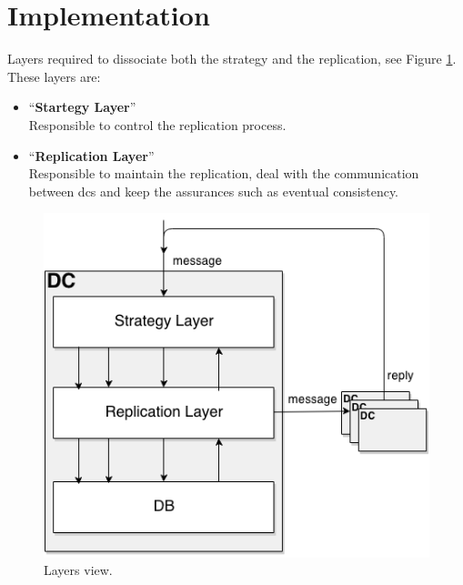 \documentclass[english]{article}
\begin{document}
\section{Implementation}
Layers required to dissociate both the strategy  and the replication, see Figure \ref{fig:layers_view}. These layers are:
\begin{itemize}
	\item \textquotedblleft{\bf Startegy Layer}\textquotedblright\\
	Responsible to control the replication process.
	
	\item \textquotedblleft{\bf Replication Layer}\textquotedblright\\
	Responsible to maintain the replication, deal with the communication between \glspl{dc} and keep the assurances such as eventual consistency.
\end{itemize}
\begin{figure}[ht!]
	\centering
	\includegraphics[width=1\textwidth]{adatativeReplicationLayers.png}
	
	\caption{Layers view.}
	\label{fig:layers_view}
\end{figure}
\end{document}
